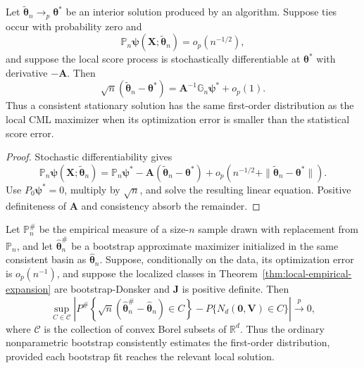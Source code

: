 \begin{proposition}
\label{prop:algorithmic-transfer}
Let $\widetilde{\boldsymbol{\theta}}_n\to_p\boldsymbol{\theta}^*$ be an interior solution produced by an
algorithm.  Suppose ties occur with probability zero and
\begin{equation}
 \mathbb P_n\boldsymbol{\psi}(\mathbf{X};\widetilde{\boldsymbol{\theta}}_n)=o_p(n^{-1/2}),
 \label{eq:algorithmic-score-error}
\end{equation}
and suppose the local score process is stochastically differentiable at
$\boldsymbol{\theta}^*$ with derivative $-\mathbf{A}$.  Then
\begin{equation}
 \sqrt n(\widetilde{\boldsymbol{\theta}}_n-\boldsymbol{\theta}^*)
 =\mathbf{A}^{-1}\mathbb G_n\boldsymbol{\psi}^*+o_p(1).
 \label{eq:algorithmic-linearity}
\end{equation}
Thus a consistent stationary solution has the same first-order distribution
as the local CML maximizer when its optimization error is smaller than the
statistical score error.
\end{proposition}

\begin{proof}
Stochastic differentiability gives
\[
 \mathbb P_n\boldsymbol{\psi}(\mathbf{X};\widetilde{\boldsymbol{\theta}}_n)
 =\mathbb P_n\boldsymbol{\psi}^*-\mathbf{A}(\widetilde{\boldsymbol{\theta}}_n-\boldsymbol{\theta}^*)
  +o_p(n^{-1/2}+\|\widetilde{\boldsymbol{\theta}}_n-\boldsymbol{\theta}^*\|).
\]
Use $P_0\boldsymbol{\psi}^*=0$, multiply by $\sqrt n$, and solve the resulting linear
equation.  Positive definiteness of $\mathbf{A}$ and consistency absorb the remainder.
\end{proof}

\begin{theorem}
\label{thm:bootstrap-validity}
Let $\mathbb P_n^{\#}$ be the empirical measure of a size-$n$ sample drawn
with replacement from $\mathbb P_n$, and let
$\widehat{\boldsymbol{\theta}}_n^{\#}$ be a bootstrap approximate maximizer
initialized in the same consistent basin as
$\widehat{\boldsymbol{\theta}}_n$.  Suppose, conditionally on the data, its
optimization error is $o_p(n^{-1})$, and suppose the localized classes in
Theorem~\ref{thm:local-empirical-expansion} are bootstrap-Donsker and
$\mathbf{J}$ is positive definite.  Then
\begin{equation}
 \sup_{C\in\mathcal C}
 \left|
 P^{\#}\!\left\{
 \sqrt n(\widehat{\boldsymbol{\theta}}_n^{\#}
          -\widehat{\boldsymbol{\theta}}_n)\in C
 \right\}
 -P\{N_d(\mathbf{0},\mathbf{V})\in C\}
 \right|\xrightarrow{p}0,
 \label{eq:bootstrap-validity}
\end{equation}
where $\mathcal C$ is the collection of convex Borel subsets of
$\mathbb R^d$.  Thus the ordinary nonparametric bootstrap consistently
estimates the first-order distribution, provided each bootstrap fit reaches
the relevant local solution.
\end{theorem}


